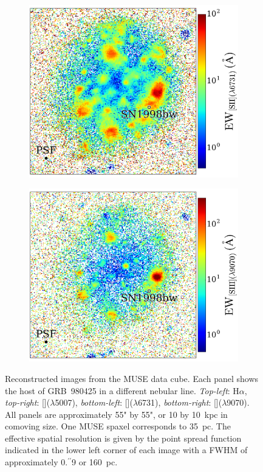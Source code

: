 \documentclass[traditabstract, referee]{aa}
\newcommand{\farc}{\hbox{$.\!\!^{\prime\prime}$}}
\newcommand{\ha}{H$\alpha$}
\newcommand{\sii}{[\ion{S}{ii}]}
\newcommand{\siii}{[\ion{S}{iii}]}
\newcommand{\oiii}{[\ion{O}{iii}]}
\begin{document}
\begin{figure}
\begin{subfigure}{.243\textwidth}
  \includegraphics[width=1.0\linewidth]{Figs/MUSE_SN1998bw_SIIEW.pdf}
\end{subfigure}
\begin{subfigure}{.242\textwidth}
  \includegraphics[width=1.0\linewidth]{Figs/MUSE_SN1998bw_SIIIEW.pdf}
\end{subfigure}
\caption{Reconstructed images from the MUSE data cube. Each panel shows the host of GRB~980425 in a different nebular line. \textit{Top-left}: \ha, \textit{top-right}: \oiii($\lambda$5007), \textit{bottom-left}: \sii($\lambda$6731), \textit{bottom-right}: \siii($\lambda$9070). All panels are approximately 55" by 55", or 10 by 10~kpc in comoving size. One MUSE spaxel corresponds to 35~pc. The effective spatial resolution is given by the point spread function indicated in the lower left corner of each image with a FWHM of approximately 0\farc{9} or 160~pc.}
\label{fig:EW}
\end{figure}
\end{document}
